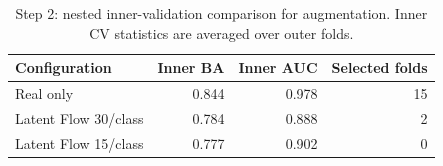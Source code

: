 \begin{table}[t]
\centering
\caption{Step 2: nested inner-validation comparison for augmentation. Inner CV statistics are averaged over outer folds.}
\label{tab:step2_candidates}
\small
\begin{tabular}{lrrr}
\toprule
Configuration & Inner BA & Inner AUC & Selected folds \\
\midrule
Real only & 0.844 & 0.978 & 15 \\
Latent Flow 30/class & 0.784 & 0.888 & 2 \\
Latent Flow 15/class & 0.777 & 0.902 & 0 \\
\bottomrule
\end{tabular}
\end{table}
